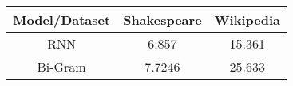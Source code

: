 \begin{center}
\begin{tabular}{||c c c||} 
    \hline
    Model/Dataset & Shakespeare & Wikipedia \\ [0.5ex] 
    \hline\hline
    RNN & 6.857 & 15.361 \\ 
    \hline
    Bi-Gram & 7.7246 & 25.633 \\
    \hline
\end{tabular}
\end{center}